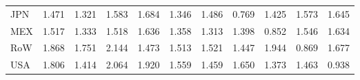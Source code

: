 \begin{table}[htbp]
\begin{tabular}{lcccccccccc}
  JPN & \textcolor[RGB]{135,87,120}{1.471} & \textcolor[RGB]{194,125,61}{1.321} & \textcolor[RGB]{84,54,171}{1.583} & \textcolor[RGB]{56,36,199}{1.684} & \textcolor[RGB]{186,120,69}{1.346} & \textcolor[RGB]{122,79,133}{1.486} & \textcolor[RGB]{247,160,8}{0.769} & \textcolor[RGB]{156,101,99}{1.425} & \textcolor[RGB]{87,56,168}{1.573} & \textcolor[RGB]{71,46,184}{1.645} \\ 
  MEX & \textcolor[RGB]{110,71,145}{1.517} & \textcolor[RGB]{189,122,66}{1.333} & \textcolor[RGB]{107,69,148}{1.518} & \textcolor[RGB]{74,48,181}{1.636} & \textcolor[RGB]{184,119,71}{1.358} & \textcolor[RGB]{201,130,54}{1.313} & \textcolor[RGB]{168,109,87}{1.398} & \textcolor[RGB]{242,157,13}{0.852} & \textcolor[RGB]{92,59,163}{1.546} & \textcolor[RGB]{77,50,178}{1.634} \\ 
  RoW & \textcolor[RGB]{20,13,235}{1.868} & \textcolor[RGB]{46,30,209}{1.751} & \textcolor[RGB]{3,2,252}{2.144} & \textcolor[RGB]{133,86,122}{1.473} & \textcolor[RGB]{112,73,143}{1.513} & \textcolor[RGB]{105,68,150}{1.521} & \textcolor[RGB]{143,92,112}{1.447} & \textcolor[RGB]{8,5,247}{1.944} & \textcolor[RGB]{237,153,18}{0.869} & \textcolor[RGB]{59,38,196}{1.677} \\ 
  USA & \textcolor[RGB]{25,16,230}{1.806} & \textcolor[RGB]{158,102,97}{1.414} & \textcolor[RGB]{5,3,250}{2.064} & \textcolor[RGB]{10,7,245}{1.920} & \textcolor[RGB]{89,58,166}{1.559} & \textcolor[RGB]{140,91,115}{1.459} & \textcolor[RGB]{69,45,186}{1.650} & \textcolor[RGB]{176,114,79}{1.373} & \textcolor[RGB]{138,89,117}{1.463} & \textcolor[RGB]{232,150,23}{0.938} \\ 
   \hline
\end{tabular}
\end{table}
